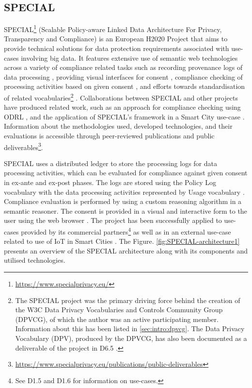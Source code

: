 \subsection{SPECIAL}
SPECIAL\footnote{\url{https://www.specialprivacy.eu/}} (Scalable Policy-aware Linked Data Architecture For Privacy, Transparency and Compliance) is an European H2020 Project that aims to provide technical solutions for data protection requirements associated with use-cases involving big data. It features extensive use of semantic web technologies across a variety of compliance related tasks such as recording provenance logs of data processing \cite{kirrane_scalable_2018}, providing visual interfaces for consent \cite{drozd_consent_nodate,gritzalis_i_2019}, compliance checking of processing activities based on given consent \cite{westphal_spirit:_nodate,vos_odrl_2019,fernandez_user_2019}, and efforts towards standardisation of related vocabularies\footnote{The SPECIAL project was the primary driving force behind the creation of the W3C Data Privacy Vocabularies and Controls Community Group (DPVCG), of which the author was an active participating member. Information about this has been listed in \autoref{sec:intro:dpvcg}. The Data Privacy Vocabulary (DPV), produced by the DPVCG, has also been documented as a deliverable of the project in D6.5 \cite{pandit_d6.5_2019}.} \cite{bonatti_data_2018,pandit_creating_2019}.
Collaborations between SPECIAL and other projects have produced related work, such as an approach for compliance checking using ODRL \cite{agarwal_legislative_2018,vos_odrl_2019}, and the application of SPECIAL's framework in a Smart City use-case \cite{fernandez_user_2019}.
Information about the methodologies used, developed technologies, and their evaluations is accessible through peer-reviewed publications and public deliverables\footnote{\url{https://www.specialprivacy.eu/publications/public-deliverables}}.

SPECIAL uses a distributed ledger to store the processing logs for data processing activities, which can be evaluated for compliance against given consent in ex-ante and ex-post phases. The logs are stored using the  Policy Log vocabulary\cite{bonatti_special_2018-1} with the data processing activities represented by Usage vocabulary \cite{bonatti_special_2018-2}. Compliance evaluation is performed by using a custom reasoning algorithm \cite{bonatti_fast_2018,bonatti_richer_2019} in a semantic reasoner. The consent is provided in a visual and interactive form to the user using the web browser \cite{drozd_consent_nodate,gritzalis_i_2019}. The project has been successfully applied to use-cases provided by its commercial partners\footnote{See D1.5 \cite{bonatti_d1.5_2018} and D1.6 \cite{schlehahn_d1.6_2018} for information on use-cases.} as well as in an external use-case related to use of IoT in Smart Cities \cite{fernandez_user_2019}. The Figure. \ref{fig:SPECIAL-architecture1} presents an overview of the SPECIAL architecture along with its components and utilised technologies.


